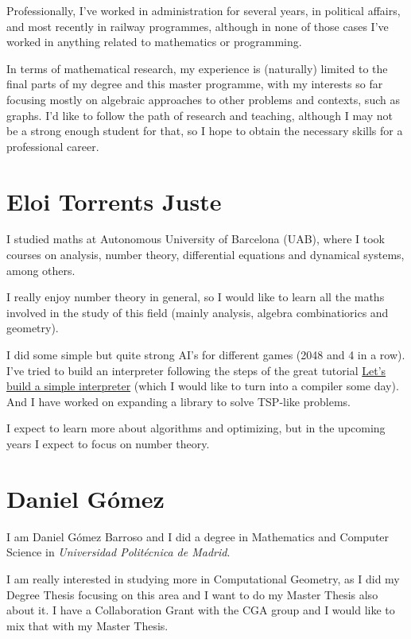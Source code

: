 \documentclass[11pt]{amsart}
\begin{document}
Professionally, I've worked in administration for several years, in political affairs, and most recently in railway programmes, although in none of those cases I've worked in anything related to mathematics or programming.

In terms of mathematical research, my experience is (naturally) limited to the final parts of my degree and this master programme, with my interests so far focusing mostly on algebraic approaches to other problems and contexts,
such as graphs. I'd like to follow the path of research and teaching, although I may not be a strong enough student for that, so I hope to obtain the necessary skills for a professional career.
\medskip

\section*{Eloi Torrents Juste}

I studied maths at Autonomous University of Barcelona (UAB), where I took courses on analysis, number theory, differential equations and dynamical systems, among others.

I really enjoy number theory in general, so I would like to learn all the maths involved in the study of this field (mainly analysis, algebra combinatiorics and geometry).

I did some simple but quite strong AI's for different games (2048 and 4 in a row). I've tried to build an interpreter following the steps of the great tutorial \href{https://ruslanspivak.com/lsbasi-part1/}{Let’s build a simple interpreter} (which I would like to turn into a compiler some day). And I have worked on expanding a library to solve TSP-like problems.

I expect to learn more about algorithms and optimizing, but in the upcoming years I expect to focus on number theory.

\medskip

\section*{Daniel Gómez}

I am Daniel Gómez Barroso and I did a degree in Mathematics and Computer Science in \textit{Universidad Politécnica de Madrid}.

I am really interested in studying more in Computational Geometry, as I did my Degree Thesis focusing on this area and I want to do my Master Thesis also about it. I have a Collaboration Grant with the CGA group and I would like to mix that with my Master Thesis.
\end{document}
